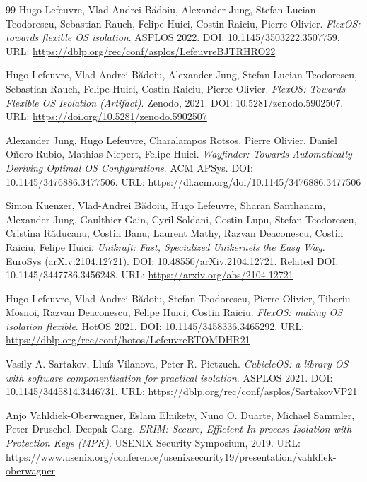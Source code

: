 \documentclass[UTF8,a4paper,12pt,twoside]{ctexart}  %
\begin{document}
\begin{thebibliography}{99}
\setlength{\itemsep}{0pt}
 Hugo Lefeuvre, Vlad-Andrei Bădoiu, Alexander Jung, Stefan Lucian
Teodorescu, Sebastian Rauch, Felipe Huici, Costin Raiciu, Pierre
Olivier. \emph{FlexOS: towards flexible OS isolation}. ASPLOS 2022. DOI:
10.1145/3503222.3507759. URL:
\url{https://dblp.org/rec/conf/asplos/LefeuvreBJTRHRO22}

 Hugo Lefeuvre, Vlad-Andrei Bădoiu, Alexander Jung, Stefan Lucian
Teodorescu, Sebastian Rauch, Felipe Huici, Costin Raiciu, Pierre
Olivier. \emph{FlexOS: Towards Flexible OS Isolation (Artifact)}.
Zenodo, 2021. DOI: 10.5281/zenodo.5902507. URL:
\url{https://doi.org/10.5281/zenodo.5902507}

 Alexander Jung, Hugo Lefeuvre, Charalampos Rotsos, Pierre
Olivier, Daniel Oñoro-Rubio, Mathias Niepert, Felipe Huici.
\emph{Wayfinder: Towards Automatically Deriving Optimal OS
Configurations}. ACM APSys. DOI:
10.1145/3476886.3477506. URL:
\url{https://dl.acm.org/doi/10.1145/3476886.3477506}

 Simon Kuenzer, Vlad-Andrei Bădoiu, Hugo Lefeuvre, Sharan
Santhanam, Alexander Jung, Gaulthier Gain, Cyril Soldani, Costin Lupu,
Stefan Teodorescu, Cristina Răducanu, Costin Banu, Laurent Mathy, Razvan
Deaconescu, Costin Raiciu, Felipe Huici. \emph{Unikraft: Fast,
Specialized Unikernels the Easy Way}. EuroSys
(arXiv:2104.12721). DOI: 10.48550/arXiv.2104.12721. Related DOI:
10.1145/3447786.3456248. URL: \url{https://arxiv.org/abs/2104.12721}

 Hugo Lefeuvre, Vlad-Andrei Bădoiu, Stefan Teodorescu, Pierre
Olivier, Tiberiu Mosnoi, Razvan Deaconescu, Felipe Huici, Costin Raiciu.
\emph{FlexOS: making OS isolation flexible}. HotOS 2021. DOI:
10.1145/3458336.3465292. URL:
\url{https://dblp.org/rec/conf/hotos/LefeuvreBTOMDHR21}

 Vasily A. Sartakov, Lluís Vilanova, Peter R. Pietzuch.
\emph{CubicleOS: a library OS with software componentisation for
practical isolation}. ASPLOS 2021. DOI: 10.1145/3445814.3446731. URL:
\url{https://dblp.org/rec/conf/asplos/SartakovVP21}

 Anjo Vahldiek-Oberwagner, Eslam Elnikety, Nuno O. Duarte,
Michael Sammler, Peter Druschel, Deepak Garg. \emph{ERIM: Secure,
Efficient In-process Isolation with Protection Keys (MPK)}. USENIX
Security Symposium, 2019. URL:
\url{https://www.usenix.org/conference/usenixsecurity19/presentation/vahldiek-oberwagner}


\end{thebibliography}
\end{document}
